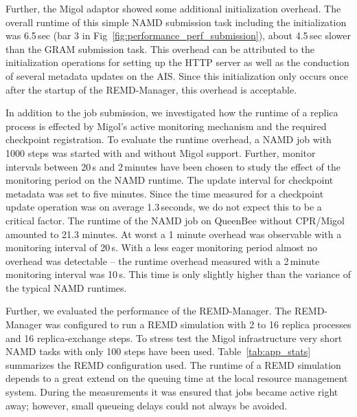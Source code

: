 \documentclass[times, 10pt, twocolumn]{article}
\begin{document}
Further, the Migol adaptor showed some additional initialization
overhead.  The overall runtime of this simple NAMD submission task
including the initialization was 6.5\,sec (bar 3 in
Fig~\ref{fig:performance_perf_submission}), about 4.5\,sec slower than
the GRAM submission task. This overhead can be attributed to the
initialization operations for setting up the HTTP server as well as
the conduction of several metadata updates on the AIS. Since this
initialization only occurs once after the startup of the REMD-Manager,
this overhead is acceptable.
                                                                                                                    
In addition to the job submission, we investigated how the runtime of
a replica process is effected by Migol's active monitoring mechanism
and the required checkpoint registration.  To evaluate the runtime
overhead, a NAMD job with 1000 steps was started with and without
Migol support.  Further, monitor intervals between 20\,s and
2\,minutes have been chosen to study the effect of the monitoring
period on the NAMD runtime.  The update interval for checkpoint
metadata was set to five minutes.  Since the time measured for a
checkpoint update operation was on average 1.3\,seconds, we do not
expect this to be a critical factor.  The runtime of the NAMD job on
QueenBee without CPR/Migol amounted to 21.3 minutes.  At worst a 1
minute overhead was observable with a monitoring interval of
20\,s. With a less eager monitoring period almost no overhead was
detectable -- the runtime overhead measured with a 2\,minute
monitoring interval was 10\,s. This time is only slightly higher than
the variance of the typical NAMD runtimes.

Further, we evaluated the performance of the REMD-Manager.  
The REMD-Manager was configured to run a REMD simulation with 
2 to 16 replica processes and 16 replica-exchange
steps. To stress test the Migol infrastructure very short NAMD tasks
with only 100 steps have been used. Table~\ref{tab:app_stats}
summarizes the REMD configuration used. The runtime of a REMD simulation depends 
to a great extend on the queuing time at the local resource 
management system. During the measurements it was ensured that jobs became 
active right away; however, small queueing delays could not always be avoided.
\end{document}
